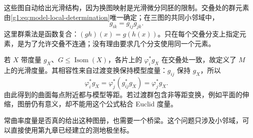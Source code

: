 这些图自动给出光滑结构，因为换图映射是光滑微分同胚的限制。交叠处的群元素由\eqref{g1:eq:model-local-determination}唯一确定；在三图的共同小邻域中，
\[
	g_{ik}=g_{ij}g_{jk}.
\]
这里群乘法是函数复合：\((gh)(x)=g(h(x))\)。只在每个交叠分支上指定元素，是为了允许交叠不连通；没有理由要求几个分支使用同一个元素。

\ProseParagraphBreak

若 \(X\) 带度量 \(g_X\)、\(G\le\operatorname{Isom}(X)\)，各片上的 \(\varphi_i^*g_X\) 在交叠处一致，故定义了 \(M\) 上的光滑度量。其相容性来自过渡变换保持模型度量：\(g_{ij}\) 保持 \(g_X\)，所以
\[
	\varphi_i^*g_X=\varphi_j^*(g_{ij}^*g_X)=\varphi_j^*g_X.
\]
由此得到的曲面每点附近都与模型等距。若过渡群包含非等距变换，例如平面的伸缩，图册仍有意义，却不能用这个公式粘合 Euclid 度量。

常曲率度量是否真的给出这种图册，也需要一个桥梁。这个问题只涉及小邻域，可以直接使用第九章已经建立的测地极坐标。

